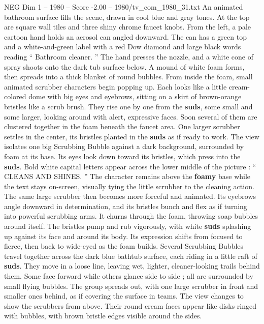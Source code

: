 \begin{textsample}{NEG Dim 1 – 1980 – Score -2.00 – 1980/tv\_com\_1980\_31.txt}  \label{ex:f1_neg_041}
An animated bathroom surface fills the scene, drawn in cool blue and gray tones.
At the top are square wall tiles and three shiny chrome faucet knobs.
From the left, a pale cartoon hand holds an aerosol can angled downward.
The can has a green top and a white-and-green label with a red Dow diamond and large black words reading “ Bathroom cleaner. ” The hand presses the nozzle, and a white cone of spray shoots onto the dark tub surface below.
A mound of white foam forms, then spreads into a thick blanket of round bubbles.
From inside the foam, small animated scrubber characters begin popping up.
Each looks like a little cream-colored dome with big eyes and eyebrows, sitting on a skirt of brown-orange bristles like a scrub brush.
They rise one by one from the \textbf{suds}, some small and some larger, looking around with alert, expressive faces.
Soon several of them are clustered together in the foam beneath the faucet area.
One larger scrubber settles in the center, its bristles planted in the \textbf{suds} as if ready to work.
The view isolates one big Scrubbing Bubble against a dark background, surrounded by foam at its base.
Its eyes look down toward its bristles, which press into the \textbf{suds}.
Bold white capital letters appear across the lower middle of the picture : “ CLEANS AND SHINES. ” The character remains above the \textbf{foamy} base while the text stays on-screen, visually tying the little scrubber to the cleaning action.
The same large scrubber then becomes more forceful and animated.
Its eyebrows angle downward in determination, and its bristles bunch and flex as if turning into powerful scrubbing arms.
It churns through the foam, throwing soap bubbles around itself.
The bristles pump and rub vigorously, with white \textbf{suds} splashing up against its face and around its body.
Its expression shifts from focused to fierce, then back to wide-eyed as the foam builds.
Several Scrubbing Bubbles travel together across the dark blue bathtub surface, each riding in a little raft of \textbf{suds}.
They move in a loose line, leaving wet, lighter, cleaner-looking trails behind them.
Some face forward while others glance side to side ; all are surrounded by small flying bubbles.
The group spreads out, with one large scrubber in front and smaller ones behind, as if covering the surface in teams.
The view changes to show the scrubbers from above.
Their round cream faces appear like disks ringed with bubbles, with brown bristle edges visible around the sides.

\end{textsample}
